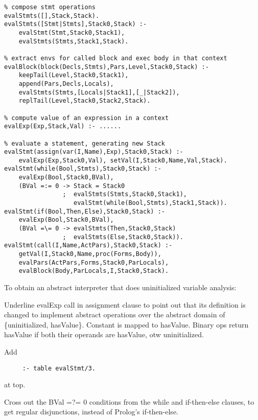 \begin{verbatim}
% compose stmt operations
evalStmts([],Stack,Stack).
evalStmts([Stmt|Stmts],Stack0,Stack) :-
    evalStmt(Stmt,Stack0,Stack1),
    evalStmts(Stmts,Stack1,Stack).

% extract envs for called block and exec body in that context
evalBlock(block(Decls,Stmts),Pars,Level,Stack0,Stack) :-
    keepTail(Level,Stack0,Stack1),
    append(Pars,Decls,Locals),
    evalStmts(Stmts,[Locals|Stack1],[_|Stack2]),
    replTail(Level,Stack0,Stack2,Stack).

% compute value of an expression in a context
evalExp(Exp,Stack,Val) :- ......

% evaluate a statement, generating new Stack
evalStmt(assign(var(I,Name),Exp),Stack0,Stack) :-
    evalExp(Exp,Stack0,Val), setVal(I,Stack0,Name,Val,Stack).
evalStmt(while(Bool,Stmts),Stack0,Stack) :-
    evalExp(Bool,Stack0,BVal),
    (BVal =:= 0 -> Stack = Stack0
                ;  evalStmts(Stmts,Stack0,Stack1),
                   evalStmt(while(Bool,Stmts),Stack1,Stack)).
evalStmt(if(Bool,Then,Else),Stack0,Stack) :-
    evalExp(Bool,Stack0,BVal),
    (BVal =\= 0 -> evalStmts(Then,Stack0,Stack)
                ;  evalStmts(Else,Stack0,Stack)).
evalStmt(call(I,Name,ActPars),Stack0,Stack) :-
    getVal(I,Stack0,Name,proc(Forms,Body)),
    evalPars(ActPars,Forms,Stack0,ParLocals),
    evalBlock(Body,ParLocals,I,Stack0,Stack).
\end{verbatim}


To obtain an abstract interpreter that does uninitialized variable
analysis: 

Underline evalExp call in assignment clause to point out that its
definition is changed to implement abstract operations over the
abstract domain of \{uninitialized, hasValue\}.  Constant is mapped to
hasValue.  Binary ops return hasValue if both their operands are
hasValue, otw uninitialized.

Add
\begin{verbatim}
     :- table evalStmt/3.
\end{verbatim}
at top.

Cross out the BVal =?= 0 conditions from the while and if-then-else
clauses, to get regular disjunctions, instead of Prolog's
if-then-else.


